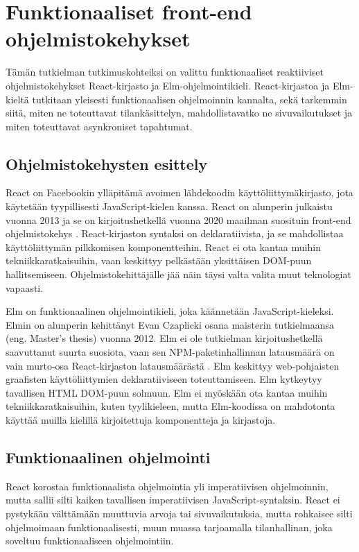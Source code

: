 \chapter{Funktionaaliset front-end ohjelmistokehykset}
Tämän tutkielman tutkimuskohteiksi on valittu funktionaaliset reaktiiviset ohjelmistokehykset React-kirjasto ja
Elm-ohjelmointikieli. React-kirjastoa ja Elm-kieltä tutkitaan yleisesti funktionaalisen ohjelmoinnin kannalta, sekä
tarkemmin siitä, miten ne toteuttavat tilankäsittelyn, mahdollistavatko ne sivuvaikutukset ja miten toteuttavat
asynkroniset tapahtumat.

\section{Ohjelmistokehysten esittely}
React on Facebookin ylläpitämä avoimen lähdekoodin käyttöliittymäkirjasto, jota käytetään tyypillisesti
JavaScript-kielen kanssa. React on alunperin julkaistu vuonna 2013 ja se on kirjoitushetkellä vuonna 2020 maailman
suosituin front-end ohjelmistokehys \cite{npmtrends}. React-kirjaston syntaksi on deklaratiivista, ja se mahdollistaa
käyttöliittymän pilkkomisen komponentteihin. React ei ota kantaa muihin tekniikkaratkaisuihin, vaan keskittyy pelkästään
yksittäisen DOM-puun hallitsemiseen. Ohjelmistokehittäjälle jää näin täysi valta valita muut teknologiat vapaasti.
\cite{reactjs}

Elm on funktionaalinen ohjelmointikieli, joka käännetään JavaScript-kieleksi. Elmin on alunperin kehittänyt Evan
Czaplicki osana maisterin tutkielmaansa (eng. Master's thesis) vuonna 2012. Elm ei ole tutkielman kirjoitushetkellä
saavuttanut suurta suosiota, vaan sen NPM-paketinhallinnan latausmäärä on vain murto-osa React-kirjaston latausmäärästä 
\cite{npmtrends}. Elm keskittyy web-pohjaisten graafisten käyttöliittymien deklaratiiviseen toteuttamiseen. Elm
kytkeytyy tavallisen HTML DOM-puun solmuun. Elm ei myöskään ota kantaa muihin tekniikkaratkaisuihin, kuten tyylikieleen,
mutta Elm-koodissa on mahdotonta käyttää muilla kielillä kirjoitettuja komponentteja ja kirjastoja. \cite{elmlang}

\section{Funktionaalinen ohjelmointi}
React korostaa funktionaalista ohjelmointia yli imperatiivisen ohjelmoinnin, mutta sallii silti kaiken tavallisen
imperatiivisen JavaScript-syntaksin. React ei pystykään välttämään muuttuvia arvoja tai sivuvaikutuksia, mutta rohkaisee
silti ohjelmoimaan funktionaalisesti, muun muassa tarjoamalla tilanhallinan, joka soveltuu funktionaaliseen
ohjelmointiin.

